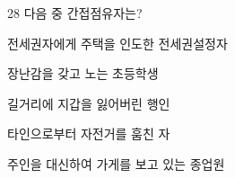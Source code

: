 \begin{question}{28}
다음 중 간접점유자는?
\begin{choices}
  \item 전세권자에게 주택을 인도한 전세권설정자
  \item 장난감을 갖고 노는 초등학생
  \item 길거리에 지갑을 잃어버린 행인
  \item 타인으로부터 자전거를 훔친 자
  \item 주인을 대신하여 가게를 보고 있는 종업원
\end{choices}
\end{question}
